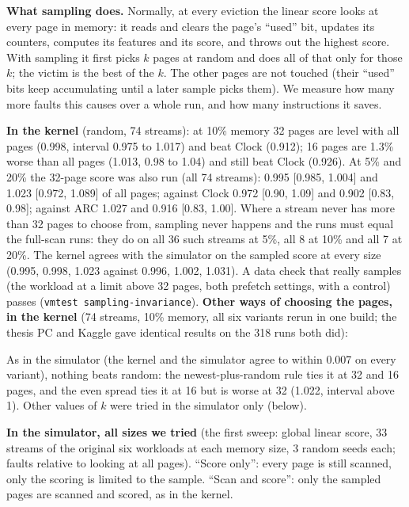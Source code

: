 \documentclass[10.5pt,a4paper]{article}
\newcommand{\code}[1]{\texttt{#1}}
\begin{document}
\textbf{What sampling does.} Normally, at every eviction the linear score looks at every page in memory: it reads and clears the page's ``used'' bit, updates its counters, computes its features and its score,
and throws out the highest score. With sampling it first picks $k$ pages at random and does all of that only for those $k$; the victim is the best of the $k$. The other pages are not touched (their ``used'' bits keep
accumulating until a later sample picks them). We measure how many more faults this causes over a whole run, and how many instructions it saves.

\textbf{In the kernel} (random, 74 streams): at 10\% memory 32 pages are level with all pages (0.998, interval 0.975 to 1.017) and beat Clock (0.912); 16 pages are 1.3\% worse than all pages (1.013, 0.98 to 1.04) and still beat Clock (0.926). At 5\% and 20\% the 32-page score was also run (all 74 streams): 0.995 [0.985, 1.004] and 1.023 [0.972, 1.089] of all pages; against Clock 0.972 [0.90, 1.09] and 0.902 [0.83, 0.98]; against ARC 1.027 and 0.916 [0.83, 1.00]. Where a stream never has more than 32 pages to choose from, sampling never happens and the runs must equal the full-scan runs: they do on all 36 such streams at 5\%, all 8 at 10\% and all 7 at 20\%. The kernel agrees with the simulator on the sampled score at every size (0.995, 0.998, 1.023 against 0.996, 1.002, 1.031). A data check that really samples (the workload at a limit above 32 pages, both prefetch settings, with a control) passes (\code{vmtest sampling-invariance}).
\textbf{Other ways of choosing the pages, in the kernel} (74 streams, 10\% memory, all six variants rerun in one build; the thesis PC and Kaggle gave identical results on the 318 runs both did):

\begin{center}\small
\resizebox{\linewidth}{!}{}
\end{center}

As in the simulator (the kernel and the simulator agree to within 0.007 on every variant), nothing beats random: the newest-plus-random rule ties it at 32 and 16 pages, and the even spread ties it at 16 but is worse at 32 (1.022, interval above 1). Other values of $k$ were tried in the simulator only (below).

\textbf{In the simulator, all sizes we tried} (the first sweep: global linear score, 33 streams of the original six workloads at each memory size, 3 random seeds each; faults relative to looking at all pages).
``Score only'': every page is still scanned, only the scoring is limited to the sample. ``Scan and score'': only the sampled pages are scanned and scored, as in the kernel.
\end{document}
